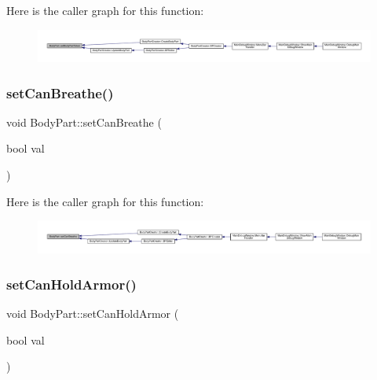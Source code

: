 Here is the caller graph for this function\+:
\nopagebreak
\begin{figure}[H]
\begin{center}
\leavevmode
\includegraphics[width=350pt]{d2/d6f/class_body_part_afe0684374c38122fe9316bedff8742dc_icgraph}
\end{center}
\end{figure}
\mbox{\label{class_body_part_a23728f2f16804c3ab90c891319e3df84}} 
\subsubsection{\texorpdfstring{set\+Can\+Breathe()}{setCanBreathe()}}
{\footnotesize\ttfamily void Body\+Part\+::set\+Can\+Breathe (\begin{DoxyParamCaption}\item[{bool}]{val }\end{DoxyParamCaption})}

Here is the caller graph for this function\+:
\nopagebreak
\begin{figure}[H]
\begin{center}
\leavevmode
\includegraphics[width=350pt]{d2/d6f/class_body_part_a23728f2f16804c3ab90c891319e3df84_icgraph}
\end{center}
\end{figure}
\mbox{\label{class_body_part_ad83118e7510cbab332815cd9254a6024}} 
\subsubsection{\texorpdfstring{set\+Can\+Hold\+Armor()}{setCanHoldArmor()}}
{\footnotesize\ttfamily void Body\+Part\+::set\+Can\+Hold\+Armor (\begin{DoxyParamCaption}\item[{bool}]{val }\end{DoxyParamCaption})}

